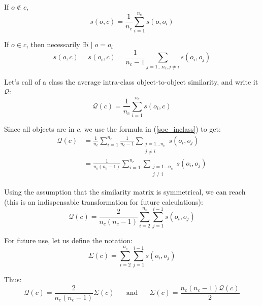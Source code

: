 \documentclass[a4paper,twoside]{article}
\begin{document}
If $o \notin c$,
\begin{equation}
  s\left(o,c\right) = \frac{1}{n_c} \sum_{i=1}^{n_c}s\left(o, o_i\right)
\end{equation}

If $o \in c$, then necessarily $\exists i \mid o = o_i$
\begin{equation} \label{soc_inclass}
  s\left(o,c\right) = s\left(o_i, c\right) = \frac{1}{n_c-1} \sum_{j=1 \ldots n_c, j \neq i} s\left(o_i, o_j\right)
\end{equation}

Let's call  of a class the average intra-class object-to-object similarity, and write it $\mathcal{Q}$:
\begin{equation}
\mathcal{Q}\left(c\right) = \frac{1}{n_c} \sum_{i=1}^{n_c} s\left(o_i, c\right)
\end{equation}

Since all objects are in $c$, we use the formula in (\ref{soc_inclass}) to get:
\begin{equation}
  \begin{aligned}
    \mathcal{Q}\left(c\right) & = \frac{1}{n_c} \sum_{i=1}^{n_c} \frac{1}{n_c-1} \sum_{\substack{j=1 \ldots n_c\\j \neq i}} s\left(o_i, o_j\right) \\
                              & = \frac{1}{n_c(n_c-1)} \sum_{i=1}^{n_c} \sum_{\substack{j=1 \ldots n_c\\j \neq i}} s\left(o_i, o_j\right)
  \end{aligned}
\end{equation}

Using the assumption that the similarity matrix is symmetrical, we can reach (this is an indispensable transformation for future calculations):
\begin{equation}
    \mathcal{Q}\left(c\right) = \frac{2}{n_c(n_c-1)} \sum_{i=2}^{n_c} \sum_{j=1}^{i-1} s\left(o_i, o_j\right)
\end{equation}

For future use, let us define the notation:
\begin{equation}
  \Sigma(c) = \sum_{i=2}^{n_c} \sum_{j=1}^{i-1} s\left(o_i, o_j\right)
\end{equation}

Thus:
\begin{equation}
    \mathcal{Q}\left(c\right) = \frac{2}{n_c(n_c-1)}\Sigma(c) \phantom{XX}\mathrm{and}\phantom{XX} \Sigma(c) = \frac{n_c(n_c-1)\mathcal{Q}\left(c\right)}{2}
\end{equation}
\end{document}
